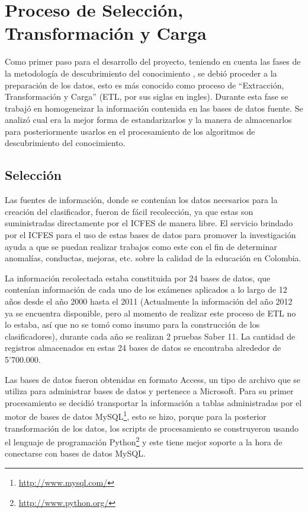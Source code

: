 \chapter{Proceso de Selección, Transformación y Carga}
Como primer paso para el desarrollo del proyecto, teniendo en cuenta las fases de la metodología de descubrimiento del conocimiento \cite{key-50}, se debió proceder a la preparación de los datos, esto es más conocido como proceso de “Extracción, Transformación y Carga” (ETL, por sus siglas en ingles). Durante esta fase se trabajó en homogeneizar la información contenida en las bases de datos fuente. Se analizó cual era la mejor forma de estandarizarlos y la manera de almacenarlos para posteriormente usarlos en el procesamiento de los algoritmos de descubrimiento del conocimiento.
\section{Selección}
Las fuentes de información, donde se contenían los datos necesarios para la creación del clasificador, fueron de fácil recolección, ya que estas son suministradas directamente por el ICFES de manera libre.
El servicio brindado por el ICFES para el uso de estas bases de datos para promover la investigación ayuda a que se puedan realizar trabajos como este con el fin de determinar anomalías, conductas, mejoras, etc. sobre la calidad de la educación en Colombia.

La información recolectada estaba constituida por 24 bases de datos, que contenían información de cada uno de los exámenes aplicados a lo largo de 12 años desde el año 2000 hasta el 2011 (Actualmente la información del año 2012 ya se encuentra disponible, pero al momento de realizar este proceso de ETL no lo estaba, así que no se tomó como insumo para la construcción de los clasificadores), durante cada año se realizan 2 pruebas Saber 11\degree. La cantidad de registros almacenados en estas 24 bases de datos se encontraba alrededor de 5’700.000.

Las bases de datos fueron obtenidas en formato Access, un tipo de archivo que se utiliza para administrar bases de datos y pertenece a Microsoft. Para su primer procesamiento se decidió transportar la información a tablas administradas por el motor de bases de datos MySQL\footnote{\url{http://www.mysql.com/}}, esto se hizo, porque para la posterior transformación de los datos, los scripts de procesamiento se construyeron usando el lenguaje de programación Python\footnote{\url{http://www.python.org/}} y este tiene mejor soporte a la hora de conectarse con bases de datos MySQL.
